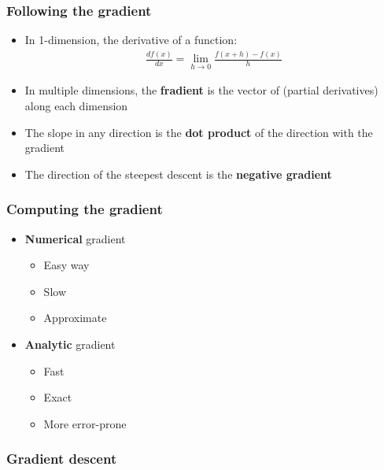 \documentclass{scrartcl}
\begin{document}
\subsubsection{Following the gradient}

\begin{itemize}
	\item In 1-dimension, the derivative of a function:
	\begin{align*}
		\frac{df(x)}{dx}=\lim\limits_{h\rightarrow0}\frac{f(x+h)-f(x)}{h}
	\end{align*}
	\item In multiple dimensions, the \textbf{fradient} is the vector of (partial derivatives) along each dimension
	\item The slope in any direction is the \textbf{dot product} of the direction with the gradient
	\item The direction of the steepest descent is the \textbf{negative gradient}
\end{itemize}

\subsubsection{Computing the gradient}

\begin{itemize}
	\item \textbf{Numerical} gradient
	\begin{itemize}
		\item Easy way
		\item Slow
		\item Approximate
	\end{itemize}
	\item \textbf{Analytic} gradient
	\begin{itemize}
		\item Fast
		\item Exact
		\item More error-prone
	\end{itemize}
\end{itemize}

\subsubsection{Gradient descent}
\end{document}
